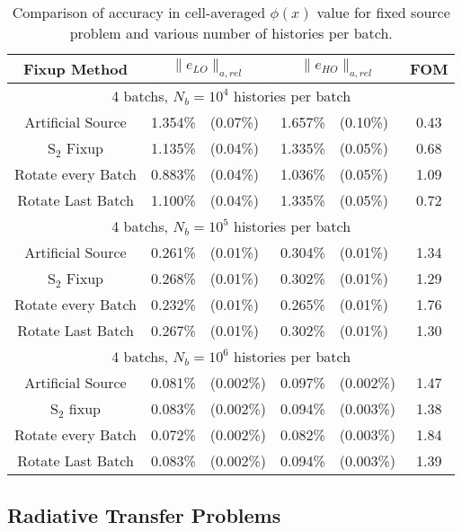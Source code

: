 \begin{table}
    \caption{\label{tab:fixed_source_accuracy} Comparison of accuracy in cell-averaged $\phi(x)$ value for
fixed source problem and various number of histories per batch.}
    \begin{tabular}{|c|cl|cl|c|} \hline
      Fixup  Method & \multicolumn{2}{|c|}{$\|e_{LO}\|_{a,rel}$} & 
        \multicolumn{2}{|c|}{$\|e_{HO}\|_{a,rel}$} &\multicolumn{1}{|c|}{FOM}
        \\ \hline 
        \multicolumn{6}{|c|}{4 batchs, $N_b = 10^4$ histories per batch} \\ \hline
     Artificial Source &1.354\%  & (0.07\%)  & 1.657\%  & (0.10\%) & 0.43  \\  
       S$_2$ Fixup &1.135\%  & (0.04\%)  & 1.335\%  & (0.05\%) & 0.68  \\  
 Rotate every Batch &0.883\%  & (0.04\%)  & 1.036\%  & (0.05\%) & 1.09  \\  
   Rotate Last Batch &1.100\%  & (0.04\%)  & 1.335\%  & (0.05\%) & 0.72  \\ \hline 
   \multicolumn{6}{|c|}{4 batchs, $N_b = 10^5$ histories per batch} \\ \hline
     Artificial Source &0.261\%  & (0.01\%)  & 0.304\%  & (0.01\%) & 1.34  \\  
       S$_2$ Fixup &0.268\%  & (0.01\%)  & 0.302\%  & (0.01\%) & 1.29  \\  
 Rotate every Batch &0.232\%  & (0.01\%)  & 0.265\%  & (0.01\%) & 1.76  \\  
   Rotate Last Batch &0.267\%  & (0.01\%)  & 0.302\%  & (0.01\%) & 1.30  \\ \hline 
   \multicolumn{6}{|c|}{4 batchs, $N_b = 10^6$ histories per batch} \\ \hline
     Artificial Source &0.081\%  & (0.002\%)  & 0.097\%  & (0.002\%) & 1.47  \\  
       S$_2$ fixup &0.083\%  & (0.002\%)  & 0.094\%  & (0.003\%) & 1.38  \\  
 Rotate every Batch &0.072\%  & (0.002\%)  & 0.082\%  & (0.003\%) & 1.84  \\  
   Rotate Last Batch &0.083\%  & (0.002\%)  & 0.094\%  & (0.003\%) & 1.39  \\ \hline 
    \end{tabular}
\end{table}

\subsection{Radiative Transfer Problems}

